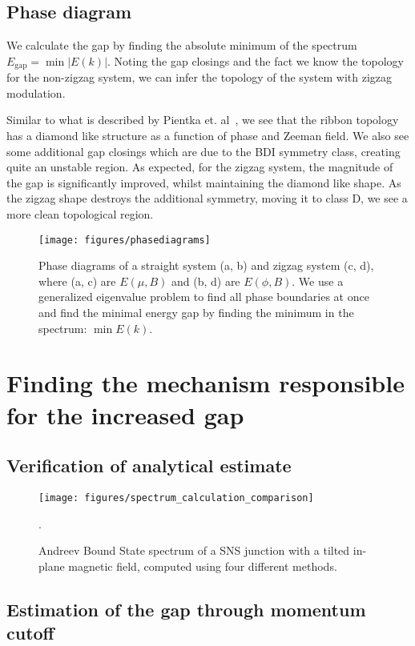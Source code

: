 		\subsection{Phase diagram}
			We calculate the gap by finding the absolute minimum of the spectrum $E_\textrm{gap}=\min{|E(k)|}$.
			Noting the gap closings and the fact we know the topology for the non-zigzag system, we can infer the topology of the system with zigzag modulation. %

			Similar to what is described by Pientka et. al~\cite{pientka2017topological}, we see that the ribbon topology has a diamond like structure as a function of phase and Zeeman field.
			We also see some additional gap closings which are due to the BDI symmetry class, creating quite an unstable region.
			As expected, for the zigzag system, the magnitude of the gap is significantly improved, whilst maintaining the diamond like shape.
			As the zigzag shape destroys the additional symmetry, moving it to class D, we see a more clean topological region.

			\begin{figure}[!htb]
			\centering
			\texttt{[image: figures/phasediagrams]}
			\caption{Phase diagrams of a straight system (a, b) and zigzag system (c, d), where (a, c) are $E(\mu, B)$ and (b, d) are $E(\phi, B)$.
			We use a generalized eigenvalue problem to find all phase boundaries at once and find the minimal energy gap by finding the minimum in the spectrum: $\min{E(k)}$.
			\label{fig:phasediagrams}}
			\end{figure}

	\section{Finding the mechanism responsible for the increased gap}
		\subsection{Verification of analytical estimate}
			\begin{figure}[!htb]
			\centering
			\texttt{[image: figures/spectrum\_calculation\_comparison]}
			\caption{Andreev Bound State spectrum of a SNS junction with a tilted in-plane magnetic field, computed using four different methods.}.
			\label{fig:spectrum_calculation_comparison}
			\end{figure}
			
		\subsection{Estimation of the gap through momentum cutoff}

		